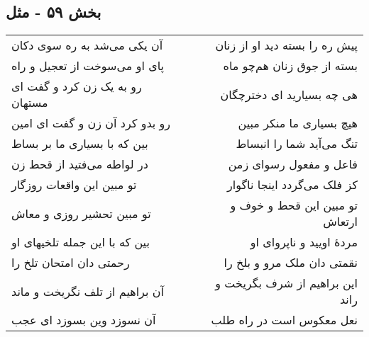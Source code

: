 \begin{center}
\section*{بخش ۵۹ - مثل}
\label{sec:sh059}
\begin{longtable}{l p{0.5cm} r}
آن یکی می‌شد به ره سوی دکان
&&
پیش ره را بسته دید او از زنان
\\
پای او می‌سوخت از تعجیل و راه
&&
بسته از جوق زنان هم‌چو ماه
\\
رو به یک زن کرد و گفت ای مستهان
&&
هی چه بسیارید ای دخترچگان
\\
رو بدو کرد آن زن و گفت ای امین
&&
هیچ بسیاری ما منکر مبین
\\
بین که با بسیاری ما بر بساط
&&
تنگ می‌آید شما را انبساط
\\
در لواطه می‌فتید از قحط زن
&&
فاعل و مفعول رسوای زمن
\\
تو مبین این واقعات روزگار
&&
کز فلک می‌گردد اینجا ناگوار
\\
تو مبین تحشیر روزی و معاش
&&
تو مبین این قحط و خوف و ارتعاش
\\
بین که با این جمله تلخیهای او
&&
مردهٔ اویید و ناپروای او
\\
رحمتی دان امتحان تلخ را
&&
نقمتی دان ملک مرو و بلخ را
\\
آن براهیم از تلف نگریخت و ماند
&&
این براهیم از شرف بگریخت و راند
\\
آن نسوزد وین بسوزد ای عجب
&&
نعل معکوس است در راه طلب
\\
\end{longtable}
\end{center}
